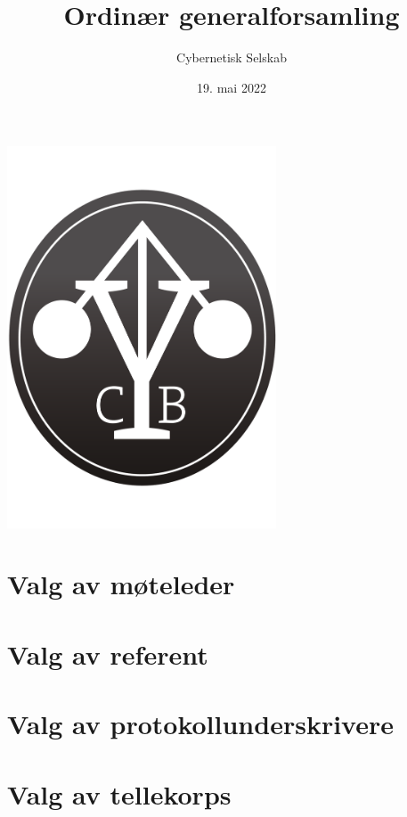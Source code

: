 \documentclass[10pt,norsk,a4paper,usenames,dvipsnames]{article}
\title{\huge Ordinær generalforsamling}
\author{\LARGE Cybernetisk Selskab}
\date{19. mai 2022}
\begin{document}
\maketitle



\begin{center}


\includegraphics[width=0.6\textwidth,height=0.6\textheight,keepaspectratio=true]{cyblogoa3.pdf}

\end{center}


\newpage


\tableofcontents

\section{Valg av møteleder}


\section{Valg av referent}


\section{Valg av protokollunderskrivere}


\section{Valg av tellekorps}
\end{document}
